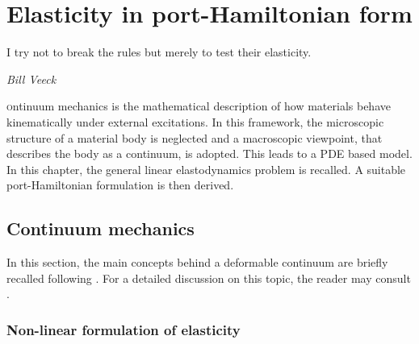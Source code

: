 \chapter{Elasticity in port-Hamiltonian form}\label{ch:elasPH}

\epigraph{I try not to break the rules but merely to test their elasticity.}{\textit{Bill Veeck}}
\minitoc

\lettrine{\color{theme}{C}}ontinuum mechanics is the mathematical description of how materials behave kinematically under external excitations. In this framework, the microscopic structure of a material body is neglected and a macroscopic viewpoint, that describes the body as a continuum, is adopted. This leads to a PDE based model. In this chapter, the general linear elastodynamics problem is recalled. A suitable port-Hamiltonian formulation is then derived.

\section{Continuum mechanics}
In this section, the main concepts behind a deformable continuum are briefly recalled following \cite{lee2012mixed}. For a detailed discussion on this topic, the reader may consult \cite{abeyaratne2012notes,landau2012elasticity}. 

\subsection{Non-linear formulation of elasticity}


